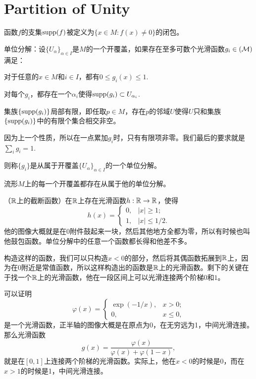 
\chapter{Partition of Unity}

函数$f$的支集$\operatorname{supp}(f)$被定义为$\{x\in M:f(x)\neq 0\}$的闭包。

\para \label{POUdef} 单位分解：设$\{U_\alpha\}_{\alpha\in I}$是$M$的一个开覆盖，如果存在至多可数个光滑函数$g_i\in \cal(M)$满足：

 对于任意的$x\in M$和$i\in I$，都有$0\leq g_i(x)\leq 1$.

 对每个$g_i$，都存在一个${\alpha_i}$使得$\operatorname{supp}(g_i)\subset U_{\alpha_i}$.

 集族$\{\operatorname{supp}(g_i)\}$局部有限，即任取$p\in M$，存在$p$的邻域$U$使得$U$只和集族$\{\operatorname{supp}(g_i)\}$中的有限个集合相交非空。

 因为上一个性质，所以在一点累加$g_i$时，只有有限项非零。我们最后的要求就是$\sum_i g_i=1$.

则称$\{g_i\}$是从属于开覆盖$\{U_\alpha\}_{\alpha\in I}$的一个单位分解。

\lem \label{POU}流形$M$上的每一个开覆盖都存在从属于他的单位分解。

\para （$\mathbb{R}$上的截断函数）在$\mathbb{R}$上存在光滑函数$h:\mathbb{R}\to\mathbb{R}$，使得
\[
	h(x)=
		\begin{cases}
		0,&|x|\geq 1;\\
		1,&|x|\leq 1/2.
		\end{cases}
\]
他的图像大概就是在$0$附件鼓起来一块，然后其他地方全都为零，所以有时候也叫他鼓包函数。单位分解中的任意一个函数都长得和他差不多。

构造这样的函数，我们可以只构造$x<0$的部分，然后将其偶函数拓展到$\mathbb{R}$上，因为在$0$附近是常值函数，所以这样构造出的函数是$\mathbb{R}$上的光滑函数。剩下的关键在于找一个$\mathbb{R}$上的光滑函数，他在一段区间上可以光滑连接两个阶梯$0$和$1$。

可以证明
\[
	\varphi(x)=
		\begin{cases}
			\exp(-1/x),&x> 0;\\
			0,&x\leq 0,
		\end{cases}
\]
是一个光滑函数，正半轴的图像大概是在原点为0，在无穷远为1，中间光滑连接。那么光滑函数
\[
	g(x)=\frac{\varphi(x)}{\varphi(x)+\varphi(1-x)},
\]
就是在$[0,1]$上连接两个阶梯的光滑函数。实际上，他在$x<0$的时候是0，而在$x>1$的时候是1，中间光滑连接。

